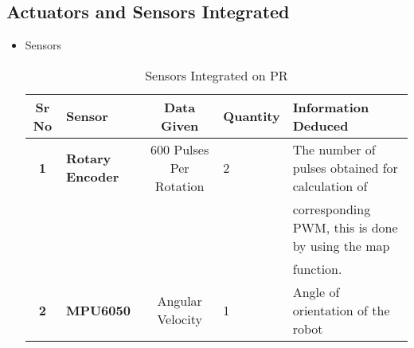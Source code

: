     \subsection{Actuators and Sensors Integrated}
        \begin{itemize}
            \item Sensors
                \begin{table}[h]
                    \caption {Sensors Integrated on PR} \label{Sensors_PR}  \small
                    \begin{tabular}{|c|l|c|l|l|}
                        \hline  \hline
                        \textbf{Sr No}  & \textbf{Sensor}           & \textbf{Data Given}       & \textbf{Quantity} & \textbf{Information Deduced}                                          \\ \hline   \hline
                        \textbf{1}      & \textbf{Rotary Encoder}   & 600 Pulses Per Rotation   &        2          & The number of pulses obtained for calculation of                      \\
                                        &                           &                           &                   & corresponding PWM, this is done by using the map                      \\ 
                                        &                           &                           &                   & function.                                                             \\ \hline
                        \textbf{2}      & \textbf{MPU6050}          & Angular Velocity          &        1          & Angle of orientation of the robot                                     \\ \hline   \hline
                    \end{tabular}
                \end{table}
                

\end{itemize}
